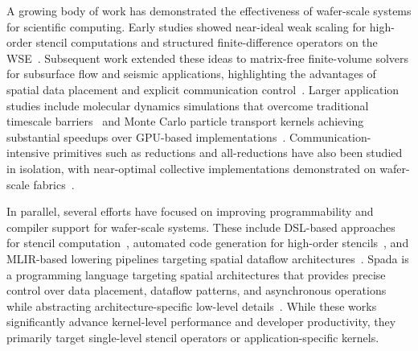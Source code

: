 \documentclass[sigconf]{acmart}
\begin{document}

A growing body of work has demonstrated the effectiveness of wafer-scale systems for scientific computing. Early studies showed near-ideal weak scaling for high-order stencil computations and structured finite-difference operators on the WSE~\cite{scalable_25pt_stencil,Rocki,mathias,Sai,sai2}. Subsequent work extended these ideas to matrix-free finite-volume solvers for subsurface flow and seismic applications, highlighting the advantages of spatial data placement and explicit communication control~\cite{sai_fv_arxiv,Ltaief}. Larger application studies include molecular dynamics simulations that overcome traditional timescale barriers~\cite{perez_md_sc24,perez-journal} and Monte Carlo particle transport kernels achieving substantial speedups over GPU-based implementations~\cite{Tramm24,Yoshii26}. Communication-intensive primitives such as reductions and all-reductions have also been studied in isolation, with near-optimal collective implementations demonstrated on wafer-scale fabrics~\cite{luczynski_reduce}.

In parallel, several efforts have focused on improving programmability and compiler support for wafer-scale systems. These include DSL-based approaches for stencil computation~\cite{brown}, automated code generation for high-order stencils~\cite{sai_codegen_sc24}, and MLIR-based lowering pipelines targeting spatial dataflow architectures~\cite{stawinoga_mlir_stencils_wse}.
Spada is a programming language targeting spatial architectures that provides precise control over data placement, dataflow patterns, and asynchronous operations while abstracting architecture-specific low-level details~\cite{spada}.
While these works significantly advance kernel-level performance and developer productivity, they primarily target single-level stencil operators or application-specific kernels.%
\end{document}
